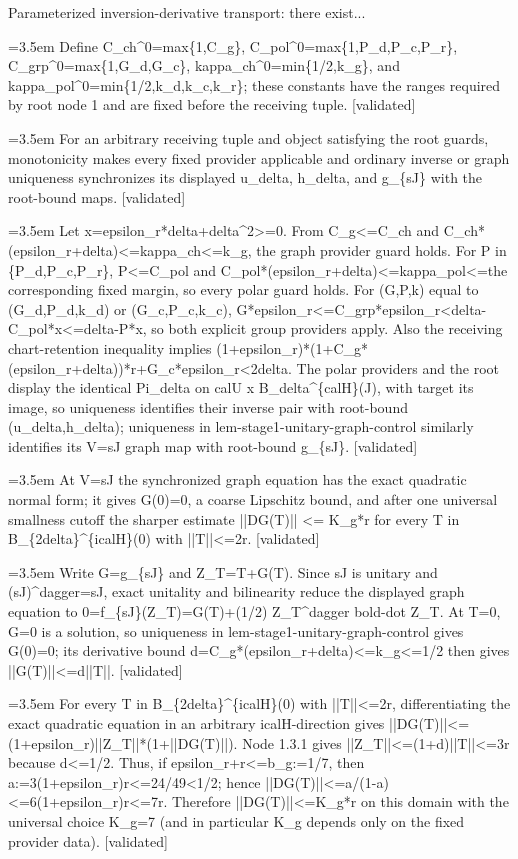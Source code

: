 \documentclass{article}
\newcommand{\step}[1]{\par\noindent\hangindent=3.5em\hangafter=1%
  \makebox[3.5em][l]{\textbf{#1.}}}
\newcommand{\steptag}[1]{\hfill{\small\textsf{[#1]}}}
\begin{document}
\begin{proofbox}{Parameterized inversion-derivative transport: there exist...}
\step{1.1.2} Define C\_ch\textasciicircum{}0=max\{1,C\_g\}, C\_pol\textasciicircum{}0=max\{1,P\_d,P\_c,P\_r\}, C\_grp\textasciicircum{}0=max\{1,G\_d,G\_c\}, kappa\_ch\textasciicircum{}0=min\{1/2,k\_g\}, and kappa\_pol\textasciicircum{}0=min\{1/2,k\_d,k\_c,k\_r\}; these constants have the ranges required by root node 1 and are fixed before the receiving tuple. \steptag{validated} \\[4pt]
\step{1.2} For an arbitrary receiving tuple and object satisfying the root guards, monotonicity makes every fixed provider applicable and ordinary inverse or graph uniqueness synchronizes its displayed u\_delta, h\_delta, and g\_\{sJ\} with the root-bound maps. \steptag{validated} \\[6pt]
\step{1.2.1} Let x=epsilon\_r*delta+delta\textasciicircum{}2>=0. From C\_g<=C\_ch and C\_ch*(epsilon\_r+delta)<=kappa\_ch<=k\_g, the graph provider guard holds. For P in \{P\_d,P\_c,P\_r\}, P<=C\_pol and C\_pol*(epsilon\_r+delta)<=kappa\_pol<=the corresponding fixed margin, so every polar guard holds. For (G,P,k) equal to (G\_d,P\_d,k\_d) or (G\_c,P\_c,k\_c), G*epsilon\_r<=C\_grp*epsilon\_r<delta-C\_pol*x<=delta-P*x, so both explicit group providers apply. Also the receiving chart-retention inequality implies (1+epsilon\_r)*(1+C\_g*(epsilon\_r+delta))*r+G\_c*epsilon\_r<2delta. The polar providers and the root display the identical Pi\_delta on calU x B\_delta\textasciicircum{}\{calH\}(J), with target its image, so uniqueness identifies their inverse pair with root-bound (u\_delta,h\_delta); uniqueness in lem-stage1-unitary-graph-control similarly identifies its V=sJ graph map with root-bound g\_\{sJ\}. \steptag{validated} \\[4pt]
\step{1.3} At V=sJ the synchronized graph equation has the exact quadratic normal form; it gives G(0)=0, a coarse Lipschitz bound, and after one universal smallness cutoff the sharper estimate ||DG(T)|| <= K\_g*r for every T in B\_\{2delta\}\textasciicircum{}\{icalH\}(0) with ||T||<=2r. \steptag{validated} \\[6pt]
\step{1.3.1} Write G=g\_\{sJ\} and Z\_T=T+G(T). Since sJ is unitary and (sJ)\textasciicircum{}dagger=sJ, exact unitality and bilinearity reduce the displayed graph equation to 0=f\_\{sJ\}(Z\_T)=G(T)+(1/2) Z\_T\textasciicircum{}dagger bold-dot Z\_T. At T=0, G=0 is a solution, so uniqueness in lem-stage1-unitary-graph-control gives G(0)=0; its derivative bound d=C\_g*(epsilon\_r+delta)<=k\_g<=1/2 then gives ||G(T)||<=d||T||. \steptag{validated} \\[4pt]
\step{1.3.2} For every T in B\_\{2delta\}\textasciicircum{}\{icalH\}(0) with ||T||<=2r, differentiating the exact quadratic equation in an arbitrary icalH-direction gives ||DG(T)||<=(1+epsilon\_r)||Z\_T||*(1+||DG(T)||). Node 1.3.1 gives ||Z\_T||<=(1+d)||T||<=3r because d<=1/2. Thus, if epsilon\_r+r<=b\_g:=1/7, then a:=3(1+epsilon\_r)r<=24/49<1/2; hence ||DG(T)||<=a/(1-a)<=6(1+epsilon\_r)r<=7r. Therefore ||DG(T)||<=K\_g*r on this domain with the universal choice K\_g=7 (and in particular K\_g depends only on the fixed provider data). \steptag{validated} \\[4pt]

\end{proofbox}
\end{document}
